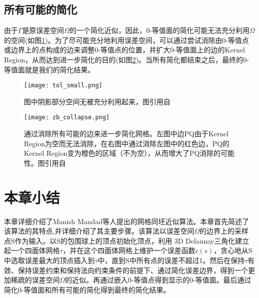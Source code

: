 \subsection{所有可能的简化}
由于$\Gamma$是原误差空间$\Omega$的一个简化近似，因此，0-等值面的简化可能无法充分利用$\Omega$的空间(如图\ref{fig:tol-small})。为了尽可能充分地利用误差空间，可以通过尝试消除由0-等值点或边界上的点构成的边来调整0-等值点的位置，并扩大0-等值面上的边的Kernel Region，从而达到进一步简化的目的(如图\ref{fig:all-edges-collapse})。当所有简化都结束之后，最终的0-等值面就是我们的简化结果。

\begin{figure}[htbp]
    \centering
    \texttt{[image: tol\_small.png]}
    \caption[无法利用的误差空间]{图中阴影部分空间无被充分利用起来，图引用自\cite{isotopic-appro}}
    \label{fig:tol-small}
\end{figure}

\begin{figure}[htbp]
    \centering
    \texttt{[image: zb\_collapse.png]}
    \caption[所有可能的边的消除]{通过消除所有可能的边来进一步简化网格。左图中边PQ由于Kernel Region为空而无法消除，在右图中通过消除左图中的红色边，PQ的Kernel Region变为橙色的区域（不为空），从而增大了PQ消除的可能性。图引用自\cite{isotopic-appro}}
    \label{fig:all-edges-collapse}
\end{figure}

\section{本章小结}
本章详细介绍了Manish Mandad等人提出的网格同坯近似算法\cite{isotopic-appro}。本章首先简述了该算法的其特点,并详细介绍了其主要步骤。该算法以误差空间$\Omega$的边界上的采样点S作为输入。以S的包围球上的顶点初始化顶点，利用 3D Delaunay三角化建立起一个四面体网格$\tau$，并在这个四面体网格上维护一个误差函数$\epsilon(s)$，贪心地从S中选取误差最大的顶点插入到$\tau$中，直到S中所有点的误差不超过1。然后在保持$\tau$有效、保持误差约束和保持法向约束条件的前提下、通过简化误差边界，得到一个更加稀疏的误差空间$\Omega$的近似。再通过嵌入0-等值点得到显示的0-等值面。最后通过简化0-等值面和所有可能的简化得到最终的简化结果。


